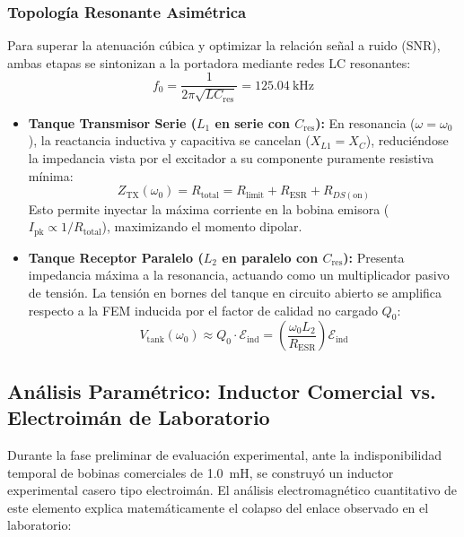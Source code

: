 \subsubsection{Topología Resonante Asimétrica}
Para superar la atenuación cúbica y optimizar la relación señal a ruido (SNR), ambas etapas se sintonizan a la portadora mediante redes LC resonantes:
\begin{equation}
    f_0 = \frac{1}{2\pi \sqrt{L C_{\text{res}}}} = \SI{125.04}{\kilo\hertz}
    \label{eq:frecuencia_resonancia}
\end{equation}
\begin{itemize}
    \item \textbf{Tanque Transmisor Serie ($L_1$ en serie con $C_{\text{res}}$):} En resonancia ($\omega = \omega_0$), la reactancia inductiva y capacitiva se cancelan ($X_{L1} = X_C$), reduciéndose la impedancia vista por el excitador a su componente puramente resistiva mínima:
    \begin{equation}
        Z_{\text{TX}}(\omega_0) = R_{\text{total}} = R_{\text{limit}} + R_{\text{ESR}} + R_{DS(\text{on})}
        \label{eq:ztx_min}
    \end{equation}
    Esto permite inyectar la máxima corriente en la bobina emisora ($I_{\text{pk}} \propto 1/R_{\text{total}}$), maximizando el momento dipolar.
    \item \textbf{Tanque Receptor Paralelo ($L_2$ en paralelo con $C_{\text{res}}$):} Presenta impedancia máxima a la resonancia, actuando como un multiplicador pasivo de tensión. La tensión en bornes del tanque en circuito abierto se amplifica respecto a la FEM inducida por el factor de calidad no cargado $Q_0$:
    \begin{equation}
        V_{\text{tank}}(\omega_0) \approx Q_0 \cdot \mathcal{E}_{\text{ind}} = \left( \frac{\omega_0 L_2}{R_{\text{ESR}}} \right) \mathcal{E}_{\text{ind}}
        \label{eq:ganancia_q_pasiva}
    \end{equation}
\end{itemize}

\subsection{Análisis Paramétrico: Inductor Comercial vs. Electroimán de Laboratorio}
\label{subsec:analisis_inductor_fallo}

Durante la fase preliminar de evaluación experimental, ante la indisponibilidad temporal de bobinas comerciales de \SI{1.0}{\milli\henry}, se construyó un inductor experimental casero tipo electroimán. El análisis electromagnético cuantitativo de este elemento explica matemáticamente el colapso del enlace observado en el laboratorio:

